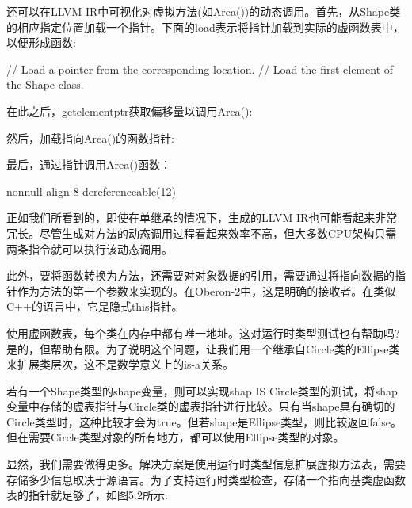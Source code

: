 还可以在LLVM IR中可视化对虚拟方法(如Area())的动态调用。首先，从Shape类的相应指定位置加载一个指针。下面的load表示将指针加载到实际的虚函数表中，以便形成函数:

\begin{shell}
// Load a pointer from the corresponding location.
// Load the first element of the Shape class.
\end{shell}

在此之后，getelementptr获取偏移量以调用Area():

\begin{shell}
\end{shell}

然后，加载指向Area()的函数指针:

\begin{shell}
\end{shell}

最后，通过指针调用Area()函数：

\begin{shell}
  nonnull align 8 dereferenceable(12) %
\end{shell}

正如我们所看到的，即使在单继承的情况下，生成的LLVM IR也可能看起来非常冗长。尽管生成对方法的动态调用过程看起来效率不高，但大多数CPU架构只需两条指令就可以执行该动态调用。

此外，要将函数转换为方法，还需要对对象数据的引用，需要通过将指向数据的指针作为方法的第一个参数来实现的。在Oberon-2中，这是明确的接收者。在类似C++的语言中，它是隐式this指针。

使用虚函数表，每个类在内存中都有唯一地址。这对运行时类型测试也有帮助吗?是的，但帮助有限。为了说明这个问题，让我们用一个继承自Circle类的Ellipse类来扩展类层次，这不是数学意义上的is-a关系。

若有一个Shape类型的shape变量，则可以实现shap IS Circle类型的测试，将shap变量中存储的虚表指针与Circle类的虚表指针进行比较。只有当shape具有确切的Circle类型时，这种比较才会为true。但若shape是Ellipse类型，则比较返回false。但在需要Circle类型对象的所有地方，都可以使用Ellipse类型的对象。

显然，我们需要做得更多。解决方案是使用运行时类型信息扩展虚拟方法表，需要存储多少信息取决于源语言。为了支持运行时类型检查，存储一个指向基类虚函数表的指针就足够了，如图5.2所示:

